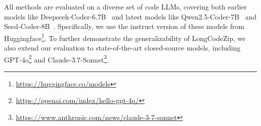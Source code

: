 \documentclass[10pt,conference]{IEEEtran}
\newcommand{\edit}[1]{{\color{black}#1}}
\newcommand{\todoc}[2]{{\textcolor{#1}{\textbf{[#2]}}}}
\newcommand{\shi}[1]{\todoc{orange}{Shi: #1}}
\newcommand{\approach}{{LongCodeZip}\xspace} %
\begin{document}
All methods are evaluated on a diverse set of code LLMs, covering both earlier models like Deepseek-Coder-6.7B~\cite{guo2024deepseek} and latest models like Qwen2.5-Coder-7B~\cite{hui2024qwen2} and Seed-Coder-8B~\cite{zhang2025seed}. Specifically, we use the instruct version of these models from Huggingface\footnote{\url{https://huggingface.co/models}}. \edit{To further demonstrate the generalizability of \approach, we also extend our evaluation to state-of-the-art closed-source models, including GPT-4o\footnote{\url{https://openai.com/index/hello-gpt-4o/}} and Claude-3.7-Sonnet\footnote{\url{https://www.anthropic.com/news/claude-3-7-sonnet}}.} 






\end{document}
